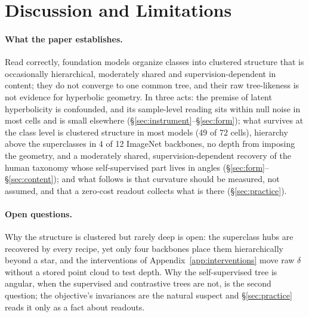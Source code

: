 \documentclass{article}
\begin{document}
\section{Discussion and Limitations}
\label{sec:discussion}

\paragraph{What the paper establishes.} Read correctly, foundation models organize classes into clustered structure that is occasionally hierarchical, moderately shared and supervision-dependent in content; they do not converge to one common tree, and their raw tree-likeness is not evidence for hyperbolic geometry. In three acts: the premise of latent hyperbolicity is confounded, and its sample-level reading sits within null noise in most cells and is small elsewhere (\S\ref{sec:instrument}--\S\ref{sec:form}); what survives at the class level is clustered structure in most models (49 of 72 cells), hierarchy above the superclasses in 4 of 12 ImageNet backbones, no depth from imposing the geometry, and a moderately shared, supervision-dependent recovery of the human taxonomy whose self-supervised part lives in angles (\S\ref{sec:form}--\S\ref{sec:content}); and what follows is that curvature should be measured, not assumed, and that a zero-cost readout collects what is there (\S\ref{sec:practice}).

\paragraph{Open questions.} Why the structure is clustered but rarely deep is open: the superclass hubs are recovered by every recipe, yet only four backbones place them hierarchically beyond a star, and the interventions of Appendix~\ref{app:interventions} move raw $\delta$ without a stored point cloud to test depth. Why the self-supervised tree is angular, when the supervised and contrastive trees are not, is the second question; the objective's invariances are the natural suspect and \S\ref{sec:practice} reads it only as a fact about readouts.
\end{document}
